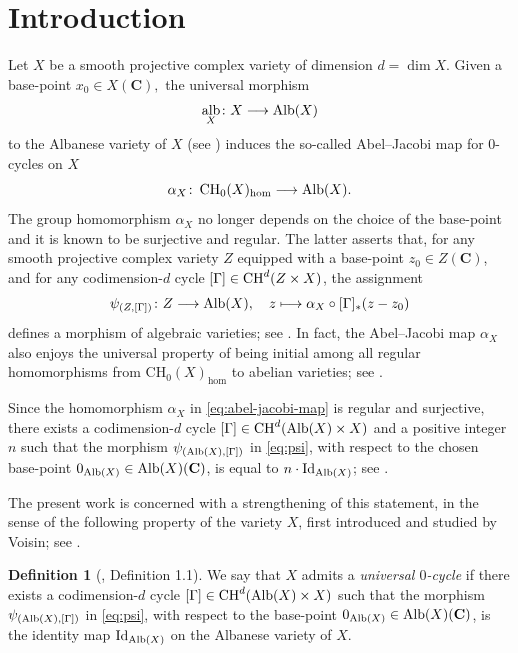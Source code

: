 \documentclass[11pt,letterpaper]{amsart}
\newcommand{\Alb}{\textnormal{Alb}}
\newcommand{\CH}{\textnormal{CH}}
\numberwithin{equation}{section}
\theoremstyle{definition}
\newtheorem{definition}[theorem]{Definition}
\theoremstyle{remark}
\newcommand{\bbC}{\mathbf{C}}
\DeclareMathOperator{\al}{alb}
\newcommand{\Ch}{\operatorname{CH_{0}}}
\DeclareMathOperator{\Id}{Id}
\begin{document}
\section{Introduction}
Let $X$ be a smooth projective complex variety of dimension $d=\dim X$. Given a base-point $x_{0}\in X(\bbC),$ the universal morphism \begin{equation*}
    \al_{X}\colon X\longrightarrow\Alb(X)
\end{equation*}
to the Albanese variety of $X$ (see \cite[Theorem 1.4.4]{Murre}) induces the so-called Abel--Jacobi map for $0$-cycles on $X$ \begin{equation}
    \label{eq:abel-jacobi-map} \alpha_{X}\colon\Ch(X)_{\hom}\longrightarrow\Alb(X).
\end{equation}
The group homomorphism $\alpha_{X}$ no longer depends on the choice of the base-point and it is known to be surjective and regular. The latter asserts that, for any smooth projective complex variety $Z$ equipped with a base-point $z_{0}\in Z(\bbC)$, and for any codimension-$d$ cycle $[\Gamma]\in\CH^{d}(Z\times X)$, the assignment
\begin{equation}\label{eq:psi}
    \psi_{(Z,[\Gamma])}\colon Z\longrightarrow\Alb(X),\quad z\longmapsto \alpha_{X}\circ[\Gamma]_{\ast}(z-z_{0})
\end{equation}
defines a morphism of algebraic varieties; see \cite[Definition 1.6.1]{Murre}. In fact, the Abel--Jacobi map $\alpha_{X}$ also enjoys the universal property of being initial among all regular homomorphisms from $\Ch(X)_{\hom}$ to abelian varieties; see \cite[Example 1.8(b)]{Murre}.
\par Since the homomorphism $\alpha_{X}$ in \eqref{eq:abel-jacobi-map} is regular and surjective, there exists a codimension-$d$ cycle $[\Gamma]\in\CH^{d}(\Alb(X)\times X)$ and a positive integer $n$ such that the morphism $\psi_{(\Alb(X),[\Gamma])}$ in \eqref{eq:psi}, with respect to the chosen base-point $0_{\Alb(X)}\in\Alb(X)(\bbC)$, is equal to $n\cdot\Id_{\Alb(X)}$; see \cite[Corollary 1.6.3]{Murre}.\par

The present work is concerned with a strengthening of this statement, in the sense of the following property of the variety $X$, first introduced and studied by Voisin; see \cite{Voisin2024CycleCO,Voisin2025}.

\begin{definition}[\cite{voisin_a}, Definition 1.1]\label{def:universal_0-cycle} We say that $X$ admits a \emph{universal $0$-cycle} if there exists a codimension-$d$ cycle $[\Gamma]\in\CH^{d}(\Alb(X)\times X)$ such that the morphism $\psi_{(\Alb(X),[\Gamma])}$ in \eqref{eq:psi}, with respect to the base-point $0_{\Alb(X)}\in\Alb(X)(\bbC)$, is the identity map $\Id_{\Alb(X)}$ on the Albanese variety of $X$. 
\end{definition}
\end{document}
